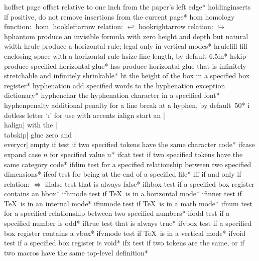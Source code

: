 \capcs hoffset {page offset relative to one inch from the paper's left edge}*{}
\capcs holdinginserts {if positive, do not remove insertions from the
   current page}*{}
\capcs hom {homology function: $\hom$}{}{}
\capcs hookleftarrow {relation: $\hookleftarrow$}{}{}
\capcs hookrightarrow {relation: $\hookrightarrow$}{}{}
\capcs hphantom {produce an invisible formula with zero height and depth but
   natural width}{}{}
\capcs hrule {produce a horizontal rule; legal only in vertical modes}*{}
\capcs hrulefill {fill enclosing space with a horizontal rule}{}{}
\capcs hsize {line length, by default 6.5\thinspace in}*{}
\capcs hskip {produce specified horizontal glue}*{}
\capcs hss {produce horizontal glue that is infinitely stretchable and 
   infinitely shrinkable}*{}
\capcs ht {the height of the box in a specified box register}*{}
\capcs hyphenation {add specified words to the
   hyphenation exception dictionary}*{}
\capcs hyphenchar {the hyphenation character in a specified font}*{}
\capcs hyphenpenalty {additional penalty for a line break at a hyphen, by
  default~50}*{}
\capcs i {dotless letter `\i' for use with accents}{}{}
\capcs ialign {start an |\\halign| with the |\\tabskip| glue zero and
   |\\everycr| empty}{}{}
\capcs if {test if two specified tokens have the same character code}*{\@if}
\capcs ifcase {expand case $n$ for specified value $n$}*{\@ifcase}
\capcs ifcat {test if two specified tokens have the same category 
   code}*{\@ifcat}
\capcs ifdim {test for a specified relationship between two specified
   dimensions}*{\@ifdim}
\capcs ifeof {test for being at the end of a specified file}*{\@ifeof}
\capcs iff {if and only if relation: $\iff$}{}{}
\capcs iffalse {test that is always false}*{\@iffalse}
\capcs ifhbox {test if a specified box register contains an hbox}*{\@ifhbox}
\capcs ifhmode {test if \TeX\ is in a horizontal mode}*{\@ifhmode}
\capcs ifinner {test if \TeX\ is in an internal mode}*{\@ifinner}
\capcs ifmmode {test if \TeX\ is in a math mode}*{\@ifmmode}
\capcs ifnum {test for a specified relationship
   between two specified numbers}*{\@ifnum}
\capcs ifodd {test if a specified number is odd}*{\@ifodd}
\capcs iftrue {test that is always true}*{\@iftrue}
\capcs ifvbox {test if a specified box register contains a vbox}*{\@ifvbox}
\capcs ifvmode {test if \TeX\ is in a vertical mode}*{\@ifvmode}
\capcs ifvoid {test if a specified box register is void}*{\@ifvoid}
\capcs ifx {test if two tokens are the same, or if
   two macros have the same top-level definition}*{\@ifx}
